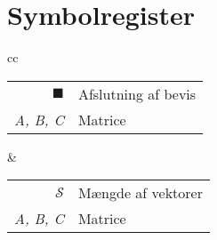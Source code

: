 \section*{Symbolregister}

\begin{tabular}{cc}
\hspace{-1cm}
    \setlength{\extrarowheight}{10pt}
    \begin{tabularx}{\textwidth}[t]{rX}
    $\blacksquare$ & Afslutning af bevis \\
    \textit{A, B, C} & Matrice  \\
    \end{tabularx}
    &
    \hspace{-9cm}
    \setlength{\extrarowheight}{10pt}
    \begin{tabularx}{\textwidth}[t]{rX}
    $\mathcal{S}$ & Mængde af vektorer\\
    \textit{A, B, C} & Matrice  \\
    \end{tabularx}
\end{tabular}

